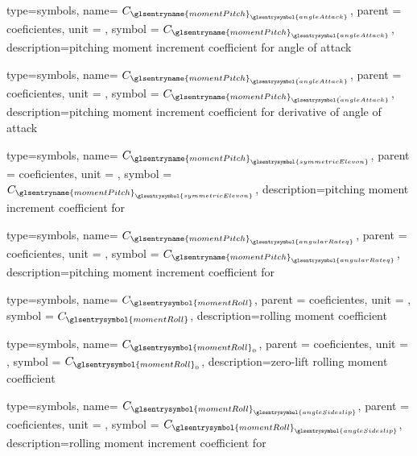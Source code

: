 {type=symbols,
    name= \ensuremath{C_{{\glsentryname{momentPitch}}_{\glsentrysymbol{angleAttack}}}},
    parent = {coeficientes},
    unit = \unexpanded{},
    symbol = \ensuremath{C_{{\glsentryname{momentPitch}}_{\glsentrysymbol{angleAttack}}}},
    description={pitching moment increment coefficient for angle of attack}
}

{type=symbols,
    name= \ensuremath{C_{{\glsentryname{momentPitch}}_{\dot{\glsentrysymbol{angleAttack}}}}},
    parent = {coeficientes},
    unit = \unexpanded{},
    symbol = \ensuremath{C_{{\glsentryname{momentPitch}}_{\dot{\glsentrysymbol{angleAttack}}}}},
    description={pitching moment increment coefficient for derivative of angle of attack}
}

{type=symbols,
    name= \ensuremath{C_{{\glsentryname{momentPitch}}_{\glsentrysymbol{symmetricElevon}}}},
    parent = {coeficientes},
    unit = \unexpanded{},
    symbol = \ensuremath{C_{{\glsentryname{momentPitch}}_{\glsentrysymbol{symmetricElevon}}}},
    description={pitching moment increment coefficient for }
}

{type=symbols,
    name= \ensuremath{C_{{\glsentryname{momentPitch}}_{\glsentrysymbol{angularRateq}}}},
    parent = {coeficientes},
    unit = \unexpanded{},
    symbol = \ensuremath{C_{{\glsentryname{momentPitch}}_{\glsentrysymbol{angularRateq}}}},
    description={pitching moment increment coefficient for }
}

{type=symbols,
    name= \ensuremath{C_{\glsentrysymbol{momentRoll}}},
    parent = {coeficientes},
    unit = \unexpanded{},
    symbol = \ensuremath{C_{\glsentrysymbol{momentRoll}}},
    description={rolling moment coefficient}
}

{type=symbols,
    name= \ensuremath{C_{\glsentrysymbol{momentRoll}_{0}}},
    parent = {coeficientes},
    unit = \unexpanded{},
    symbol = \ensuremath{C_{\glsentrysymbol{momentRoll}_{0}}},
    description={zero-lift rolling moment coefficient}
}

{type=symbols,
    name= \ensuremath{C_{{\glsentrysymbol{momentRoll}}_{\glsentrysymbol{angleSideslip}}}},
    parent = {coeficientes},
    unit = \unexpanded{},
    symbol = \ensuremath{C_{{\glsentrysymbol{momentRoll}}_{\glsentrysymbol{angleSideslip}}}},
    description={rolling moment increment coefficient for }
}

